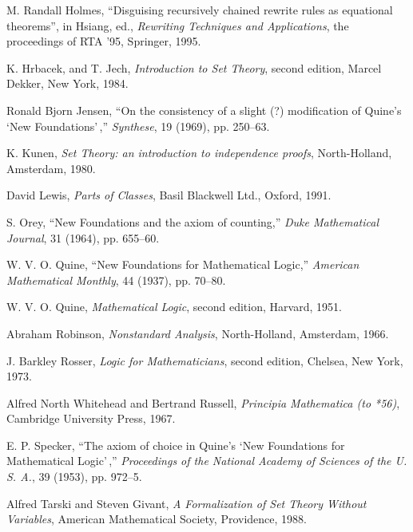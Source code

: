 \begin{thebibliography}{99}
 M. Randall Holmes, ``Disguising recursively chained
rewrite rules as equational theorems'', in Hsiang, ed., {\em Rewriting
Techniques and Applications\/}, the proceedings of RTA '95, Springer,
1995.

 K. Hrbacek, and T. Jech, {\em Introduction to Set
Theory\/}, second edition, Marcel Dekker, New York, 1984.

 Ronald Bjorn Jensen, ``On the consistency of a slight
(?) modification of Quine's `New Foundations'\,,'' {\em Synthese}, 19
(1969), pp. 250--63.

  K. Kunen, {\em Set Theory: an introduction to independence proofs\/}, North-Holland, Amsterdam, 1980.

 David Lewis, {\em Parts of Classes\/}, Basil Blackwell Ltd., Oxford, 1991.

 S. Orey, ``New Foundations and the axiom of counting,''
{\em Duke Mathematical Journal\/}, 31 (1964), pp. 655--60.

 W. V. O. Quine, ``New Foundations for Mathematical
 Logic,'' {\em American Mathematical Monthly}, 44 (1937), pp. 70--80.

 W. V. O. Quine, {\em Mathematical Logic\/}, second
edition, Harvard, 1951.

  Abraham Robinson, {\em Nonstandard Analysis\/}, North-Holland, Amsterdam, 1966.

 J. Barkley Rosser, {\em Logic for Mathematicians},
second edition, Chelsea, New York, 1973.

  Alfred North Whitehead and Bertrand Russell, {\em
Principia Mathematica (to *56)}, Cambridge University Press, 1967.

 E. P. Specker, ``The axiom of choice in Quine's `New
Foundations for Mathematical Logic'\,,'' {\em Proceedings of the
National Academy of Sciences of the U. S. A.}, 39 (1953), pp. 972--5.

 Alfred Tarski and Steven Givant, {\em A Formalization
of Set Theory Without Variables}, American Mathematical Society,
Providence, 1988.

\end{thebibliography}

